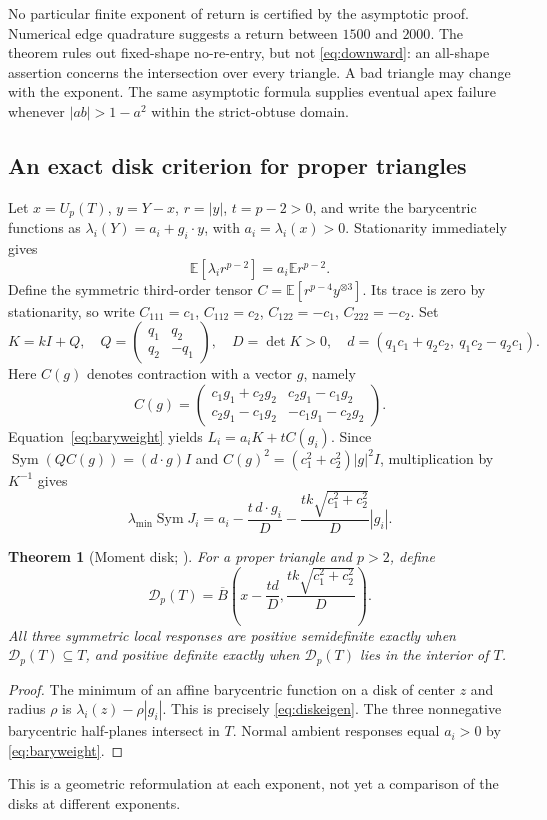 \documentclass[11pt]{article}
\newtheorem{theorem}{Theorem}[section]
\theoremstyle{definition}
\newcommand{\E}{\mathbb E}
\newcommand{\Sym}{\operatorname{Sym}}
\begin{document}
No particular finite exponent of return is certified by the asymptotic
proof. Numerical edge quadrature suggests a return between $1500$ and
$2000$. The theorem rules out fixed-shape no-re-entry, but not
\eqref{eq:downward}: an all-shape assertion concerns the intersection
over every triangle. A bad triangle may change with the exponent.
The same asymptotic formula supplies eventual apex failure whenever
$|ab|>1-a^2$ within the strict-obtuse domain.

\subsection{An exact disk criterion for proper triangles}
\label{sec:disk}
Let $x=U_p(T)$, $y=Y-x$, $r=|y|$, $t=p-2>0$, and write the barycentric
functions as $\lambda_i(Y)=a_i+g_i\cdot y$, with $a_i=\lambda_i(x)>0$.
Stationarity immediately gives
\begin{equation}\label{eq:baryweight}
 \E[\lambda_i r^{p-2}]=a_i\E r^{p-2}.
\end{equation}
Define the symmetric third-order tensor
$C=\E[r^{p-4}y^{\otimes3}]$. Its trace is zero by stationarity, so write
$C_{111}=c_1$, $C_{112}=c_2$, $C_{122}=-c_1$, $C_{222}=-c_2$.
Set
\[
 K=kI+Q,\quad Q=\begin{pmatrix}q_1&q_2\\q_2&-q_1\end{pmatrix},\quad
 D=\det K>0,\quad
 d=(q_1c_1+q_2c_2,\ q_1c_2-q_2c_1).
\]
Here $C(g)$ denotes contraction with a vector $g$, namely
\[
 C(g)=\begin{pmatrix}
 c_1g_1+c_2g_2&c_2g_1-c_1g_2\\
 c_2g_1-c_1g_2&-c_1g_1-c_2g_2
 \end{pmatrix}.
\]
Equation~\eqref{eq:baryweight} yields $L_i=a_iK+tC(g_i)$.
Since $\Sym(QC(g))=(d\cdot g)I$ and
$C(g)^2=(c_1^2+c_2^2)|g|^2I$, multiplication by $K^{-1}$ gives
\begin{equation}\label{eq:diskeigen}
 \lambda_{\min}\Sym J_i
 =a_i-\frac{t\,d\cdot g_i}{D}
       -\frac{tk\sqrt{c_1^2+c_2^2}}D|g_i|.
\end{equation}
\begin{theorem}[Moment disk; \cite{Projective}]
For a proper triangle and $p>2$, define
\[
 \mathcal D_p(T)=\overline B\left(x-\frac{td}{D},
                    \frac{tk\sqrt{c_1^2+c_2^2}}D\right).
\]
All three symmetric local responses are positive semidefinite exactly
when $\mathcal D_p(T)\subseteq T$, and positive definite exactly when
$\mathcal D_p(T)$ lies in the interior of $T$.
\end{theorem}
\begin{proof}
The minimum of an affine barycentric function on a disk of center $z$
and radius $\rho$ is $\lambda_i(z)-\rho|g_i|$. This is precisely
\eqref{eq:diskeigen}. The three nonnegative barycentric half-planes
intersect in $T$. Normal ambient responses equal $a_i>0$ by
\eqref{eq:baryweight}.
\end{proof}
This is a geometric reformulation at each exponent, not yet a comparison
of the disks at different exponents.
\end{document}

